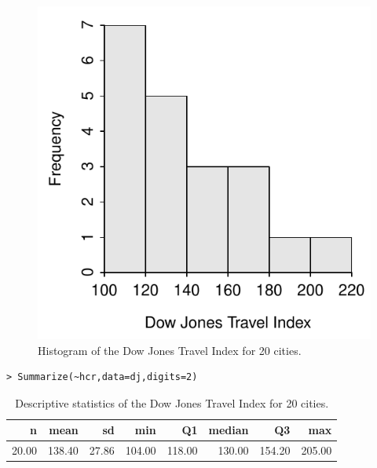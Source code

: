 \documentclass[10pt,openany]{book}\usepackage[]{graphicx}\usepackage[]{color}
\makeatletter
\newenvironment{kframe}{%
 \def\at@end@of@kframe{}%
 \ifinner\ifhmode%
  \def\at@end@of@kframe{\end{minipage}}%
  \begin{minipage}{\columnwidth}%
 \fi\fi%
 \def\FrameCommand##1{\hskip\@totalleftmargin \hskip-\fboxsep
 \colorbox{shadecolor}{##1}\hskip-\fboxsep
     \hskip-\linewidth \hskip-\@totalleftmargin \hskip\columnwidth}%
 \MakeFramed {\advance\hsize-\width
   \@totalleftmargin\z@ \linewidth\hsize
   \@setminipage}}%
 {\par\unskip\endMakeFramed%
 \at@end@of@kframe}
\newenvironment{knitrout}{}{} %
\makeatother
\begin{document}
\begin{itemize}
\begin{knitrout}
\begin{figure}[hbtp]
{\centering \includegraphics[width=.4\linewidth]{Figs/DJHist-1} 

}

\caption[Histogram of the Dow Jones Travel Index for 20 cities]{Histogram of the Dow Jones Travel Index for 20 cities.}\label{fig:DJHist}
\end{figure}


\end{knitrout}
\begin{knitrout}
\color{fgcolor}\begin{kframe}
\begin{verbatim}
> Summarize(~hcr,data=dj,digits=2)
\end{verbatim}
\end{kframe}
\end{knitrout}
\begin{table}[ht]
\centering
\caption{Descriptive statistics of the Dow Jones Travel Index for 20 cities.} 
\label{tab:DJSum}
\begin{tabular}{rrrrrrrr}
  \hline
n & mean & sd & min & Q1 & median & Q3 & max \\ 
  \hline
20.00 & 138.40 & 27.86 & 104.00 & 118.00 & 130.00 & 154.20 & 205.00 \\ 
   \hline
\end{tabular}
\end{table}




\end{itemize}
\end{document}
